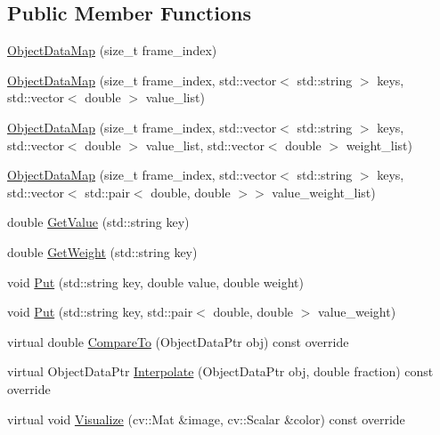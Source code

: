 \subsection*{Public Member Functions}
\begin{DoxyCompactItemize}
\item 
\hyperlink{classcore_1_1ObjectDataMap_ac6df34682a715db6845667f7dda1c795}{Object\+Data\+Map} (size\+\_\+t frame\+\_\+index)
\item 
\hyperlink{classcore_1_1ObjectDataMap_a573add8d73646e6c5f183a9a0c159596}{Object\+Data\+Map} (size\+\_\+t frame\+\_\+index, std\+::vector$<$ std\+::string $>$ keys, std\+::vector$<$ double $>$ value\+\_\+list)
\item 
\hyperlink{classcore_1_1ObjectDataMap_a5727c237d73f3f16c94a748c1b9b0c74}{Object\+Data\+Map} (size\+\_\+t frame\+\_\+index, std\+::vector$<$ std\+::string $>$ keys, std\+::vector$<$ double $>$ value\+\_\+list, std\+::vector$<$ double $>$ weight\+\_\+list)
\item 
\hyperlink{classcore_1_1ObjectDataMap_ad2af0de7438ed72be68348ac992568b6}{Object\+Data\+Map} (size\+\_\+t frame\+\_\+index, std\+::vector$<$ std\+::string $>$ keys, std\+::vector$<$ std\+::pair$<$ double, double $>$$>$ value\+\_\+weight\+\_\+list)
\item 
double \hyperlink{classcore_1_1ObjectDataMap_a276c89da6f3318d2baa2e9678e9508f7}{Get\+Value} (std\+::string key)
\item 
double \hyperlink{classcore_1_1ObjectDataMap_a4cd92ab91559063b4e6ab12fec53cc05}{Get\+Weight} (std\+::string key)
\item 
void \hyperlink{classcore_1_1ObjectDataMap_a2d104f34385edf8c3fdfda7390c28bf5}{Put} (std\+::string key, double value, double weight)
\item 
void \hyperlink{classcore_1_1ObjectDataMap_a5cdd71b9124b5ca41419a0049fbbdaa1}{Put} (std\+::string key, std\+::pair$<$ double, double $>$ value\+\_\+weight)
\item 
virtual double \hyperlink{classcore_1_1ObjectDataMap_a7fcc9ef5b684f14d33711348610d9b74}{Compare\+To} (Object\+Data\+Ptr obj) const override
\item 
virtual Object\+Data\+Ptr \hyperlink{classcore_1_1ObjectDataMap_ac6a739ea0509371929dbe7cbac601a3e}{Interpolate} (Object\+Data\+Ptr obj, double fraction) const override
\item 
virtual void \hyperlink{classcore_1_1ObjectDataMap_a8a0f71318dd58e0d527a63b904c6afac}{Visualize} (cv\+::\+Mat \&image, cv\+::\+Scalar \&color) const override
\end{DoxyCompactItemize}


